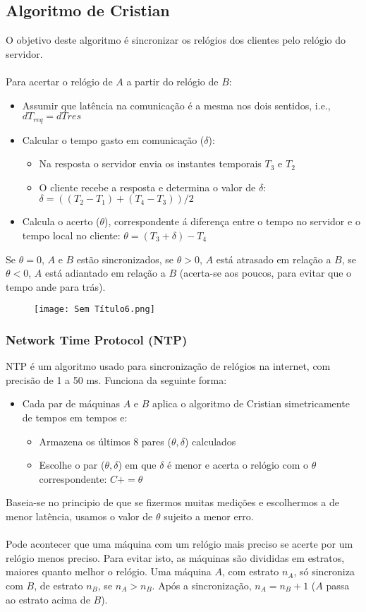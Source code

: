 \documentclass[10pt,a4paper]{report}
\begin{document}
\subsection{Algoritmo de Cristian}
O objetivo deste algoritmo é sincronizar os relógios dos clientes pelo relógio do servidor.\\
\\
Para acertar o relógio de $A$ a partir do relógio de $B$:
\begin{itemize}
\item Assumir que latência na comunicação é a mesma nos dois sentidos, i.e., $dT_{req} = dT{res}$
\item Calcular o tempo gasto em comunicação ($\delta$):
\begin{itemize}
\item Na resposta o servidor envia os instantes temporais $T_3$ e $T_2$
\item O cliente recebe a resposta e determina o valor de $\delta$: $\delta = ((T_2 - T_1) + (T_4 - T_3)) / 2$
\end{itemize}
\item Calcula o acerto ($\theta$), correspondente á diferença entre o tempo no servidor e o tempo local no cliente: $\theta = (T_3 + \delta) - T_4$
\end{itemize}
Se $\theta = 0$, $A$ e $B$ estão sincronizados, se $\theta > 0$, $A$ está atrasado em relação a $B$, se $\theta < 0$, $A$ está adiantado em relação a $B$ (acerta-se aos poucos, para evitar que o tempo ande para trás).
\begin{figure}[H]
\centering
\texttt{[image: Sem Título6.png]}
\end{figure}
\subsubsection{Network Time Protocol (NTP)}
NTP é um algoritmo usado para sincronização de relógios na internet, com precisão de 1 a 50 ms. Funciona da seguinte forma:
\begin{itemize}
\item Cada par de máquinas $A$ e $B$ aplica o algoritmo de Cristian simetricamente de tempos em tempos e:
\begin{itemize}
\item Armazena os últimos 8 pares ($\theta, \delta$) calculados
\item Escolhe o par ($\theta, \delta$) em que $\delta$ é menor e acerta o relógio com o $\theta$ correspondente: $C += \theta$
\end{itemize}
\end{itemize}
Baseia-se no principio de que se fizermos muitas medições e escolhermos a de menor latência, usamos o valor de $\theta$ sujeito a menor erro.\\
\\
Pode acontecer que uma máquina com um relógio mais preciso se acerte por um relógio menos preciso. Para evitar isto, as máquinas são divididas em estratos, maiores quanto melhor o relógio. Uma máquina $A$, com estrato $n_A$, só sincroniza com $B$, de estrato $n_B$, se $n_A > n_B$. Após a sincronização, $n_A = n_B + 1$ ($A$ passa ao estrato acima de $B$).
\end{document}
